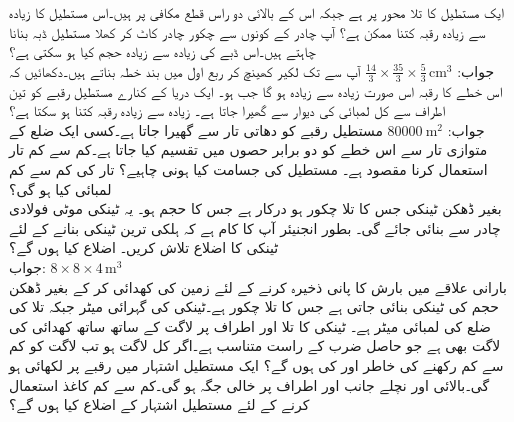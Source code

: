 ایک مستطیل کا تلا  محور پر ہے جبکہ اس کے بالائی دو راس قطع مکافی  پر ہیں۔اس مستطیل کا زیادہ سے زیادہ رقبہ کتنا ممکن ہے؟
آپ   چادر کے کونوں سے چکور چادر کاٹ کر کھلا مستطیل ڈبہ بنانا چاہتے ہیں۔اس ڈبے کی زیادہ سے زیادہ حجم کیا ہو سکتی ہے؟\\
جواب:\quad
$\tfrac{14}{3}\times \tfrac{35}{3}\times\tfrac{5}{3}\,\si{\centi\meter\cubed}$
آپ  سے  تک لکیر کھینچ کر ربع اول میں بند خطہ بناتے ہیں۔دکھائیں کہ اس خطے کا رقبہ اس صورت زیادہ سے زیادہ ہو گا جب  ہو۔ 
ایک دریا کے کنارے مستطیل رقبے کو تین اطراف سے  کل لمبائی کی دیوار سے گھیرا جاتا ہے۔ زیادہ سے زیادہ رقبہ کتنا ہو سکتا ہے؟\\
جواب:\quad
$\SI{80000}{\meter\squared}$
 مستطیل رقبے کو دھاتی تار سے گھیرا جاتا ہے۔کسی ایک ضلع کے متوازی تار سے اس خطے کو دو برابر حصوں میں تقسیم کیا جاتا ہے۔کم سے کم تار استعمال کرنا مقصود ہے۔ مستطیل کی جسامت کیا ہونی چاہیے؟ تار کی کم سے کم لمبائی کیا ہو گی؟  
\\
بغیر ڈھکن ٹینکی جس کا تلا چکور ہو درکار ہے جس کا حجم  ہو۔ یہ ٹینکی  موٹی فولادی چادر سے بنائی جائے گی۔ بطور انجنیئر آپ کا کام ہے کہ ہلکی ترین ٹینکی بنانے کے لئے ٹینکی کا اضلاع تلاش کریں۔ اضلاع کیا ہوں گے؟\\
جواب:\quad
$8\times 8\times 4\,\si{\meter\cubed}$
\\
بارانی علاقے میں بارش کا پانی ذخیرہ کرنے کے لئے زمین کی  کھدائی کر کے  بغیر ڈھکن  حجم کی ٹینکی بنائی جاتی ہے جس کا تلا چکور ہے۔ٹینکی کی گہرائی  میٹر جبکہ تلا کی ضلع کی لمبائی  میٹر ہے۔ ٹینکی کا تلا اور اطراف پر لاگت کے ساتھ ساتھ کھدائی کی لاگت بھی ہے جو حاصل ضرب  کے راست متناسب ہے۔اگر کل لاگت   ہو تب لاگت کو کم سے کم رکھنے کی خاطر  اور   کی ہوں گے؟ 
ایک مستطیل اشتہار میں  رقبے پر لکھائی ہو گی۔بالائی اور نچلے جانب  اور اطراف پر  خالی جگہ ہو گی۔کم سے کم کاغذ استعمال کرنے کے لئے مستطیل اشتہار کے اضلاع کیا ہوں گے؟ \\
